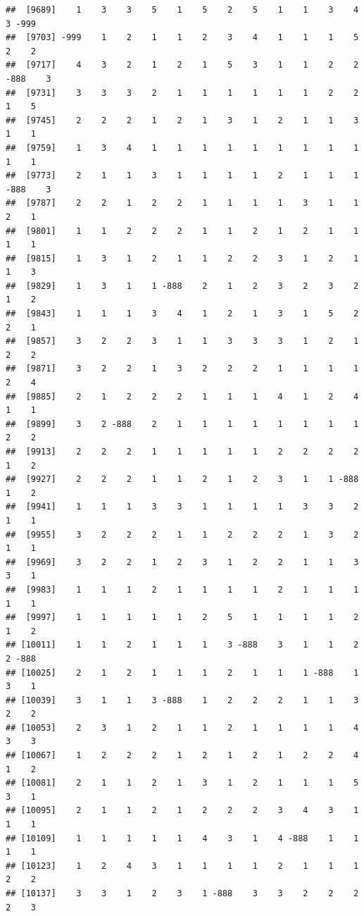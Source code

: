 \documentclass[
  12pt,
  openany]{book}
\begin{document}
\begin{verbatim}
##  [9689]    1    3    3    5    1    5    2    5    1    1    3    4    3 -999
##  [9703] -999    1    2    1    1    2    3    4    1    1    1    5    2    2
##  [9717]    4    3    2    1    2    1    5    3    1    1    2    2 -888    3
##  [9731]    3    3    3    2    1    1    1    1    1    1    2    2    1    5
##  [9745]    2    2    2    1    2    1    3    1    2    1    1    3    1    1
##  [9759]    1    3    4    1    1    1    1    1    1    1    1    1    1    1
##  [9773]    2    1    1    3    1    1    1    1    2    1    1    1 -888    3
##  [9787]    2    2    1    2    2    1    1    1    1    3    1    1    2    1
##  [9801]    1    1    2    2    2    1    1    2    1    2    1    1    1    1
##  [9815]    1    3    1    2    1    1    2    2    3    1    2    1    1    3
##  [9829]    1    3    1    1 -888    2    1    2    3    2    3    2    1    2
##  [9843]    1    1    1    3    4    1    2    1    3    1    5    2    2    1
##  [9857]    3    2    2    3    1    1    3    3    3    1    2    1    2    2
##  [9871]    3    2    2    1    3    2    2    2    1    1    1    1    2    4
##  [9885]    2    1    2    2    2    1    1    1    4    1    2    4    1    1
##  [9899]    3    2 -888    2    1    1    1    1    1    1    1    1    2    2
##  [9913]    2    2    2    1    1    1    1    1    2    2    2    2    1    2
##  [9927]    2    2    2    1    1    2    1    2    3    1    1 -888    1    2
##  [9941]    1    1    1    3    3    1    1    1    1    3    3    2    1    1
##  [9955]    3    2    2    2    1    1    2    2    2    1    3    2    1    1
##  [9969]    3    2    2    1    2    3    1    2    2    1    1    3    3    1
##  [9983]    1    1    1    2    1    1    1    1    2    1    1    1    1    1
##  [9997]    1    1    1    1    1    2    5    1    1    1    1    2    1    2
## [10011]    1    1    2    1    1    1    3 -888    3    1    1    2    2 -888
## [10025]    2    1    2    1    1    1    2    1    1    1 -888    1    3    1
## [10039]    3    1    1    3 -888    1    2    2    2    1    1    3    2    2
## [10053]    2    3    1    2    1    1    2    1    1    1    1    4    3    3
## [10067]    1    2    2    2    1    2    1    2    1    2    2    4    1    2
## [10081]    2    1    1    2    1    3    1    2    1    1    1    5    3    1
## [10095]    2    1    1    2    1    2    2    2    3    4    3    1    1    1
## [10109]    1    1    1    1    1    4    3    1    4 -888    1    1    1    1
## [10123]    1    2    4    3    1    1    1    1    2    1    1    1    2    2
## [10137]    3    3    1    2    3    1 -888    3    3    2    2    2    2    3

\end{verbatim}
\end{document}
